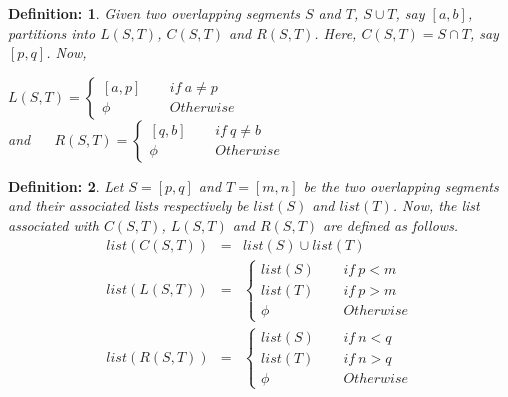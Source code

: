 \documentclass{article}
\newtheorem{definition}{Definition:}
\begin{document}
\begin{definition}
\label{d3}
Given two overlapping segments $S$ and $T$, $S\cup T$, say $[a,b]$, partitions into $L(S,T)$, $C(S,T)$ and $R(S,T)$. Here, $C(S,T) = S \cap T$, say $[p,q]$. Now, 
\begin{center}
$L(S,T)= \left \{ \begin{array}{lcl} [a,p]&~~& if~ a\neq p\\ \phi &&  Otherwise\end{array}\right .$\\
and ~~
$R(S,T)= \left \{ \begin{array}{lcl} [q,b]&~~& if~ q\neq b\\ \phi &&  Otherwise\end{array}\right .$
\end{center}
\end{definition}
\begin{definition}
\label{d4}
Let $S=[p,q]$ and $T=[m,n]$ be the two overlapping segments and their associated lists respectively be $list(S)$ and $list(T)$. Now, the list associated with $C(S,T)$, $L(S,T)$ and $R(S,T)$ are defined as follows.
\begin{eqnarray*}
list(C(S,T)) & = & list(S) \cup list (T)\\
list(L(S,T)) &= &\left \{ \begin{array}{lcl} list(S)&~~&if~p<m\\
                                             list(T)&&if~p>m\\
                                             \phi&&Otherwise
                           \end{array} \right .\\
list(R(S,T))&=&\left \{ \begin{array}{lcl} list(S)&~~&if~n<q\\
                                             list(T)&&if~n>q\\
                                             \phi&&Otherwise
                           \end{array} \right .
\end{eqnarray*}
\end{definition}
\end{document}
